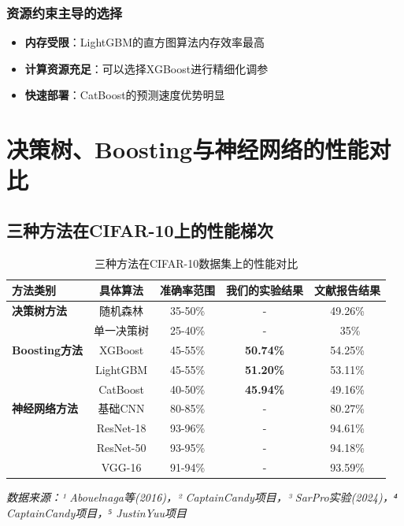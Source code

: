 \documentclass[UTF8]{report}
\theoremstyle{MyLineTheoremStyle} %
\theoremstyle{MyBlockTheoremStyle} %
\theoremstyle{MySubsubsectionStyle} %
\begin{document}
\subsubsection{资源约束主导的选择}
\begin{itemize}
    \item \textbf{内存受限}：LightGBM的直方图算法内存效率最高
    \item \textbf{计算资源充足}：可以选择XGBoost进行精细化调参
    \item \textbf{快速部署}：CatBoost的预测速度优势明显
\end{itemize}



\section{决策树、Boosting与神经网络的性能对比}
\subsection{三种方法在CIFAR-10上的性能梯次}
\begin{table}[H]
    \centering
    \caption{三种方法在CIFAR-10数据集上的性能对比}
    \begin{tabular}{lcccc}
        \toprule
        方法类别 & 具体算法 & 准确率范围 & 我们的实验结果 & 文献报告结果 \\
        \midrule
        \textbf{决策树方法} & 随机森林 & 35-50\% & - & 49.26\% \\
         & 单一决策树 & 25-40\% & - & ~35\% \\
        \textbf{Boosting方法} & XGBoost & 45-55\% & \textbf{50.74\%} & 54.25\% \\
         & LightGBM & 45-55\% & \textbf{51.20\%} & 53.11\% \\
         & CatBoost & 40-50\% & \textbf{45.94\%} & 49.16\% \\
        \textbf{神经网络方法} & 基础CNN & 80-85\% & - & 80.27\% \\
         & ResNet-18 & 93-96\% & - & 94.61\% \\
         & ResNet-50 & 93-95\% & - & 94.18\% \\
         & VGG-16 & 91-94\% & - & 93.59\% \\
        \bottomrule
    \end{tabular}
\end{table}
\textit{数据来源：¹ Abouelnaga等(2016)，² CaptainCandy项目，³ SarPro实验(2024)，⁴ CaptainCandy项目，⁵ JustinYuu项目}
\end{document}
